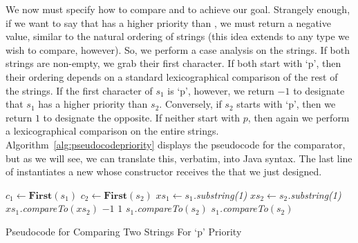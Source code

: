 We now must specify how to compare  and  to achieve our goal. Strangely enough, if we want to say that  has a higher priority than , we must return a negative value, similar to the natural ordering of strings (this idea extends to any type we wish to compare, however). So, we perform a case analysis on the strings. If both strings are non-empty, we grab their first character. If both start with `p', then their ordering depends on a standard lexicographical comparison of the rest of the strings. If the first character of $s_1$ is `p', however, we return $-1$ to designate that $s_1$ has a higher priority than $s_2$. Conversely, if $s_2$ starts with `p', then we return $1$ to designate the opposite. If neither start with $p$, then again we perform a lexicographical comparison on the entire strings. Algorithm~\ref{alg:pseudocodepriority} displays the pseudocode for the comparator, but as we will see, we can translate this, verbatim, into Java syntax. The last line of  instantiates a new  whose constructor receives the  that we just designed. 
\begin{algorithm}[H]
\begin{algorithmic}
        \State $c_1 \gets \textbf{First}(s_1)$
        \State $c_2 \gets \textbf{First}(s_2)$
            \State $xs_1 \gets s_1$\textit{.substring(1)}
            \State $xs_2 \gets s_2$\textit{.substring(1)}
            \State \Return $xs_1$\textit{.compareTo}$(xs_2)$
            \State \Return $-1$
            \State \Return $1$
        \Else
            \State \Return $s_1$\textit{.compareTo}$(s_2)$
        \EndIf
    \Else
        \State \Return $s_1$\textit{.compareTo}$(s_2)$
    \EndIf
\EndProcedure
\end{algorithmic}
\caption{Pseudocode for Comparing Two Strings For `p' Priority}
\label{alg:pseudocodeinsertion}
\end{algorithm}

